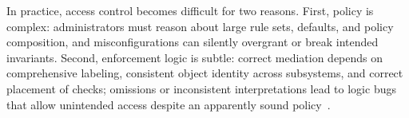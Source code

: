 In practice, access control becomes difficult for two reasons. 
First, policy is complex: administrators must reason about large rule sets, defaults, and policy composition, and misconfigurations can silently overgrant or break intended invariants. 
Second, enforcement logic is subtle: correct mediation depends on comprehensive labeling, consistent object identity across subsystems, and correct placement of checks; omissions or inconsistent interpretations lead to logic bugs that allow unintended access despite an apparently sound policy~\cite{lu2019detecting, zhang2019pex}.

